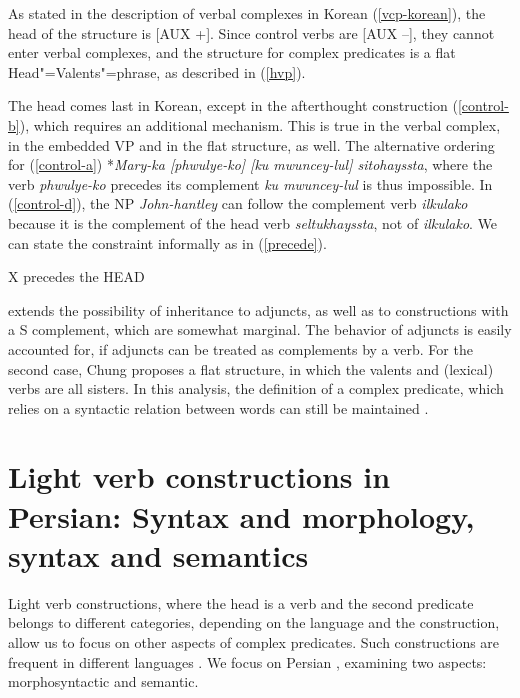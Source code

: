\documentclass[output=paper]{langsci/langscibook}
\begin{document}
	As stated in the description of verbal complexes in Korean (\ref{vcp-korean}), the head of the structure is [AUX +]. Since control verbs are [AUX --], they cannot enter verbal complexes, and the structure for complex predicates is a flat Head"=Valents"=phrase, as described in (\ref{hvp}). 
	
	
	The head comes last in Korean, except in the afterthought construction (\ref{control-b}), which requires an additional mechanism. This is true in the verbal complex, in the embedded VP and in the flat structure, as well. The alternative ordering for (\ref{control-a}) *\textit{Mary-ka [phwulye-ko] [ku mwuncey-lul] sitohayssta}, where the verb \textit{phwulye-ko} precedes its complement \textit{ku mwuncey-lul} is thus impossible. In (\ref{control-d}), the NP \textit{John-hantley} can follow the complement verb \textit{ilkulako} because it is the complement of the head verb \textit{seltukhayssta}, not of \textit{ilkulako}.   
	We can state the constraint informally as in (\ref{precede}).
	
	\begin{exe}
		\ex \label{precede}
		X precedes the HEAD
	\end{exe}
	
	\cite{CC1998} extends the possibility of inheritance to adjuncts, as well as to constructions with a S complement, which are somewhat marginal. The behavior of adjuncts is easily accounted for, if adjuncts can be treated as complements \citep{BMS2001a} by a verb. For the second case, Chung proposes a flat structure, in which the valents and (lexical) verbs are all sisters. In this analysis, the definition of a complex predicate, which relies on a syntactic relation between words can still be maintained \citep[but see][for a different proposal based on linearization]{Lee2001}.
	
	
	\section{Light verb constructions in Persian: Syntax and morphology, syntax and semantics}
	
	Light verb constructions, where the head is a verb and the second predicate belongs to different categories, depending on the language and the construction, allow us to focus on other aspects of complex predicates. Such constructions are frequent in different languages \citep[see][for noun-verb combinations in Korean]{CW2001, Lee2001}. We focus on Persian \citep{BS2010, MuellerPersian, Samvelian2012}, examining two aspects: morphosyntactic and semantic.
	
\end{document}
